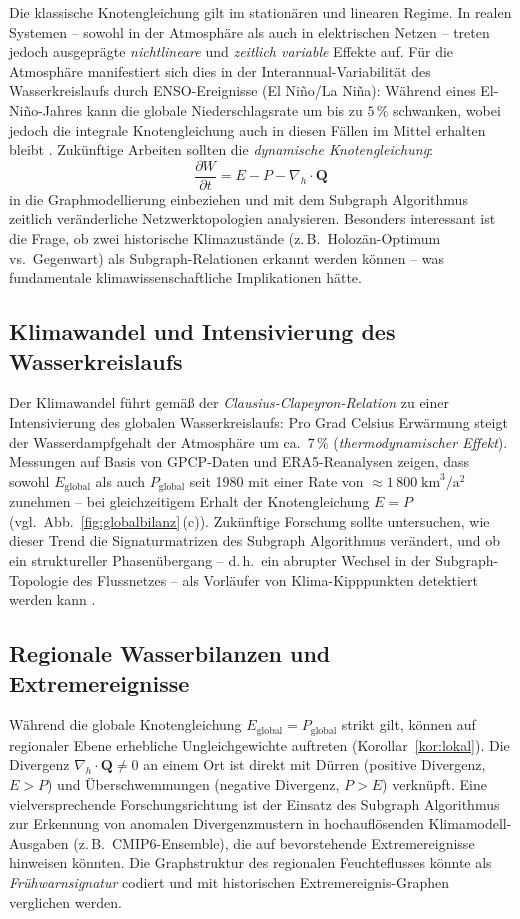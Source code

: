 ﻿\documentclass[a4paper,12pt]{article}
\theoremstyle{definition}
\begin{document}
Die klassische Knotengleichung gilt im stationären und linearen Regime.
In realen Systemen -- sowohl in der Atmosphäre als auch in elektrischen
Netzen -- treten jedoch ausgeprägte \emph{nichtlineare} und
\emph{zeitlich variable} Effekte auf. Für die Atmosph\"{a}re manifestiert
sich dies in der Interannual-Variabilität des Wasserkreislaufs durch
ENSO-Ereignisse (El Ni\~{n}o/La Ni\~{n}a): Während eines El-Ni\~{n}o-Jahres
kann die globale Niederschlagsrate um bis zu $5\,\%$ schwanken, wobei
jedoch die integrale Knotengleichung auch in diesen Fällen im Mittel
erhalten bleibt \cite{adler2018}. Zukünftige Arbeiten sollten die
\emph{dynamische Knotengleichung}:
\[
  \frac{\partial W}{\partial t} = E - P - \nabla_h \cdot \mathbf{Q}
\]
in die Graphmodellierung einbeziehen und mit dem Subgraph Algorithmus
zeitlich veränderliche Netzwerktopologien analysieren. Besonders interessant
ist die Frage, ob zwei historische Klimazustände (z.\,B.\ Holozän-Optimum
vs.\ Gegenwart) als Subgraph-Relationen erkannt werden können -- was
fundamentale klimawissenschaftliche Implikationen hätte.

\subsection{Klimawandel und Intensivierung des Wasserkreislaufs}

Der Klimawandel führt gemäß der \emph{Clausius-Clapeyron-Relation}
zu einer Intensivierung des globalen Wasserkreislaufs: Pro Grad Celsius
Erwärmung steigt der Wasserdampfgehalt der Atmosphäre um ca.\ $7\,\%$
(\textit{thermodynamischer Effekt}). Messungen auf Basis von GPCP-Daten
und ERA5-Reanalysen zeigen, dass sowohl $E_\mathrm{global}$ als auch
$P_\mathrm{global}$ seit 1980 mit einer Rate von
$\approx 1\,800\;\text{km}^3/\text{a}^2$ zunehmen -- bei gleichzeitigem
Erhalt der Knotengleichung $E = P$ (vgl.\ Abb.~\ref{fig:globalbilanz}\,(c)).
Zukünftige Forschung sollte untersuchen, wie dieser Trend die
Signaturmatrizen des Subgraph Algorithmus verändert, und ob ein
struktureller Phasenübergang -- d.\,h.\ ein abrupter Wechsel in der
Subgraph-Topologie des Flussnetzes -- als Vorläufer von Klima-Kipppunkten
detektiert werden kann \cite{lenton2008}.

\subsection{Regionale Wasserbilanzen und Extremereignisse}

Während die globale Knotengleichung $E_\mathrm{global} = P_\mathrm{global}$
strikt gilt, können auf regionaler Ebene erhebliche Ungleichgewichte
auftreten (Korollar~\ref{kor:lokal}). Die Divergenz $\nabla_h \cdot \mathbf{Q}
\neq 0$ an einem Ort ist direkt mit Dürren (positive Divergenz, $E > P$)
und Überschwemmungen (negative Divergenz, $P > E$) verknüpft. Eine
vielversprechende Forschungsrichtung ist der Einsatz des Subgraph Algorithmus
zur Erkennung von anomalen Divergenzmustern in hochauflösenden
Klimamodell-Ausgaben (z.\,B.\ CMIP6-Ensemble), die auf bevorstehende
Extremereignisse hinweisen könnten. Die Graphstruktur des regionalen
Feuchteflusses könnte als \emph{Frühwarnsignatur} codiert und mit
historischen Extremereignis-Graphen verglichen werden.
\end{document}
